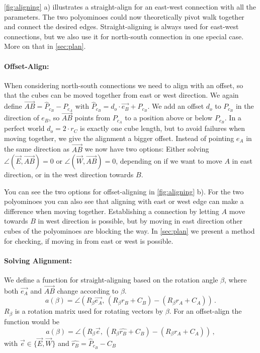 \autoref{fig:aligning} a) illustrates a straight-align for an east-west connection with all the parameters.
The two polyominoes could now theoretically pivot walk together and connect the desired edges.
Straight-aligning is always used for east-west connections, but we also use it for north-south connection in one special case. More on that in \autoref{sec:plan}.

\paragraph{Offset-Align:}

When considering north-south connections we need to align with an offset, so that the cubes can be moved together from east or west direction.
We again define $\overrightarrow{AB} = \hat{P}_{c_B} - P_{c_A}$ with $\hat{P}_{c_B} = d_o \cdot \vec{e_B} + P_{c_B}$.
We add an offset $d_o$ to $P_{c_B}$ in the direction of $e_B$, so $\overrightarrow{AB}$ points from $P_{c_A}$ to a position above or below $P_{c_B}$.
In a perfect world $d_o = 2 \cdot r_C$ is exactly one cube length, but to avoid failures when moving together, we give the alignment a bigger offset.
Instead of pointing $e_A$ in the same direction as $\overrightarrow{AB}$ we now have two options:
Either solving $\angle \left( \vec{E}, \overrightarrow{AB} \right) = 0$ or $\angle \left( \vec{W}, \overrightarrow{AB} \right) = 0$, depending on if we want to move $A$ in east direction, or in the west direction towards $B$.

You can see the two options for offset-aligning in \autoref{fig:aligning} b).
For the two polyominoes you can also see that aligning with east or west edge can make a difference when moving together.
Establishing a connection by letting $A$ move towards $B$ in west direction is possible, but by moving in east direction other cubes of the polyominoes are blocking the way.
In \autoref{sec:plan} we present a method for checking, if moving in from east or west is possible. 

\paragraph{Solving Alignment:}

We define a function for straight-aligning based on the rotation angle $\beta$, where both $\vec{e_A}$ and $\overrightarrow{AB}$ change according to $\beta$.
\begin{equation*}
a(\beta) = \angle \left( R_\beta \vec{e_A}, \, \left( R_\beta r_B + C_B \right) - \left( R_\beta r_A + C_A \right)\right) \,.
\end{equation*}
$R_\beta$ is a rotation matrix used for rotating vectors by $\beta$.
For an offset-align the function would be
\begin{equation*}
a(\beta) = \angle \left( R_\beta \vec{e}, \, \left( R_\beta \hat{r_B} + C_B \right) - \left( R_\beta r_A + C_A \right)\right) \,,
\end{equation*}
with $\vec{e} \in \{ \vec{E}, \vec{W}\}$ and $\hat{r_B} = \hat{P}_{c_B} - C_B$

